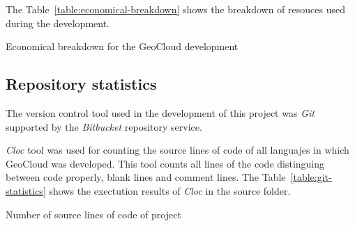 The Table~\ref{table:economical-breakdown} shows the breakdown of resouces used during the development.


\begin{table}[hp]
  \centering
  {\small
  
  }
  \caption{Economical breakdown for the GeoCloud development}
  \label{table:economical-breakdown}
\end{table}

\subsection{Repository statistics}

The version control tool used in the development of this project was \emph{Git}
supported by the \emph{Bitbucket} repository service.

\emph{Cloc} tool was used for counting the source lines of code of all languajes in which
GeoCloud was developed. This tool counts all lines of the code distinguing
between code properly, blank lines and comment lines. The Table~\ref{table:git-statistics} shows the
exectution results of \emph{Cloc} in the source folder.

\begin{table}[hp]
  \centering
  {\small
  
  }
  \caption{Number of source lines of code of project}
  \label{table:git-statistics}
\end{table}
